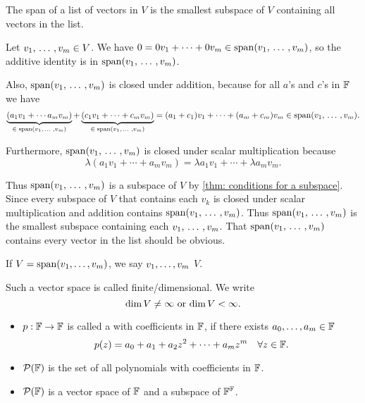 \begin{thm} 
  \label{thm: the span of a list of vectors is a subspace}
  The  span of a list of vectors in $V$ is the smallest subspace of $V$ containing all vectors in the list.
\end{thm}
\begin{prf}
  Let $v_1, {\, \ldots \,\,}, v_m \in V$. We have $0 = 0v_1 + \cdots + 0v_m \in \operatorname{span} (v_1, {\, \ldots \,\,}, v_m)$, so the additive identity is in $\operatorname{span} (v_1, {\, \ldots \,\,}, v_m)$.

  Also, $\operatorname{span} (v_1, {\, \ldots \,\,}, v_m)$ is closed under addition, because for all $a$'s and $c$'s in $\mathbb{F}$ we have
  \[
    \underbrace{(a_1 v_1 + \cdots a_m v_m)}_{\in \; \operatorname{span} (v_1, {\, \ldots \,\,}, v_m)} + \underbrace{(c_1 v_1 + \cdots + c_m v_m)}_{\in \; \operatorname{span} (v_1, {\, \ldots \,\,}, v_m)} = (a_1 + c_1)v_1 + \cdots + (a_m + c_m)v_m \in \operatorname{span} (v_1, {\, \ldots \,\,}, v_m).
  \]

  Furthermore, $\operatorname{span} (v_1, {\, \ldots \,\,}, v_m)$ is closed under scalar multiplication because
  \[
    \lambda (a_1 v_1 + \cdots + a_m v_m) = \lambda a_1 v_1 + \cdots + \lambda a_m v_m.
  \]

  Thus $\operatorname{span} (v_1, {\, \ldots \,\,}, v_m)$ is a subspace of $V$ by \ref{thm: conditions for a subspace}. Since every subspace of $V$ that contains each $v_k$ is closed under scalar multiplication and addition contains $\operatorname{span} (v_1, {\, \ldots \,\,}, v_m)$. Thus $\operatorname{span} (v_1, {\, \ldots \,\,}, v_m)$ is the smallest subspace containing each $v_1, {\, \ldots \,\,}, v_m$. That $\operatorname{span} (v_1, {\, \ldots \,\,}, v_m)$ contains every vector in the list should be obvious.
\end{prf}


\begin{mydef} 
  If $V=\operatorname{span} (v_1, \dots, v_m)$, we say $v_1, \dots, v_m$  $V$.
\end{mydef}

\setcounter{thm}{8}
\begin{mydef} 
  Such a vector space is called finite\-/dimensional. We write
  \begin{equation}
    \dim V \neq \infty$ or $\dim V < \infty.
  \end{equation}
\end{mydef}


\begin{mydef}
  \begin{itemize}
    \item $p: \mathbb{F} \to \mathbb{F}$ is called a  with coefficients in $\mathbb{F}$, if there exists $a_0, \ldots, a_m \in \mathbb{F}$ \st
    \begin{equation}
      p(z)=a_0 + a_1 + a_2z^2 + \cdots + a_m z^m \quad \forall z \in \mathbb{F}.
    \end{equation}
    \item $\mathcal{P} (\mathbb{F})$ is the set of all polynomials with coefficients in $\mathbb{F}$.
    \item $\mathcal{P} (\mathbb{F})$ is a vector space of $\mathbb{F}$ and a subspace of $\mathbb{F}^{\mathbb{F}}$.
  \end{itemize}
\end{mydef}

